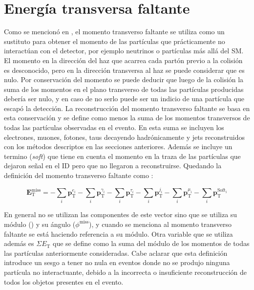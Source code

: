 \section{Energía transversa faltante}


Como se mencionó en , el momento transverso faltante se utiliza como un sustituto  para obtener el momento de las partículas que prácticamente no interactúan con el detector, por ejemplo neutrinos o partículas más allá del SM. El momento en la dirección del haz que acarrea cada partón  previo a la colisión es desconocido, pero en la dirección transversa al haz se puede considerar que es nulo. Por conservación del momento se puede deducir que luego de la colisión la suma de los momentos en el plano transverso de todas las partículas producidas debería ser nulo, y en caso de no serlo puede ser un indicio de una partícula que escapó la detección. La reconstrucción del momento transverso faltante se basa en esta conservación y se define como menos la suma de los momentos transversos de todas las partículas observadas en el evento. En esta suma se incluyen los electrones, muones, fotones, taus decayendo hadrónicamente y jets reconstruidos con los métodos descriptos en las secciones anteriores. Además se incluye un termino (\textit{soft}) que tiene en cuenta el momento en la traza de las partículas que dejaron señal en el ID pero que no llegaron a reconstruirse. Quedando la definición del momento transverso faltante como \cite{PERF-2016-07}:

\begin{equation}
\textbf{E}_{\text{T}}^{\text{miss}} = -\sum_{i}\textbf{p}_{\text{T}}^{e_i}-\sum_{i}\textbf{p}_{\text{T}}^{\gamma_i}-\sum_{i}\textbf{p}_{\text{T}}^{\tau_i}-\sum_{i}\textbf{p}_{\text{T}}^{j_i}-\sum_{i}\textbf{p}_{\text{T}}^{\mu_i}-\sum_{i}\textbf{p}_{\text{T}}^{\text{Soft}_i}
\end{equation}


En general no se utilizan las componentes de este vector sino que se utiliza su módulo (\met) y su ángulo ($\phi^{\text{miss}}$), y cuando se menciona al momento transverso faltante se está haciendo referencia a su módulo. Otra variable que se utiliza además es $\Sigma E_{\text{T}}$ que se define como la suma del módulo de los momentos de todas las partículas anteriormente consideradas. Cabe aclarar que esta definición introduce un sesgo a tener \met no nula en eventos donde no se produjo ninguna partícula no interactuante, debido a la incorrecta o insuficiente reconstrucción de todos los objetos presentes en el evento.

